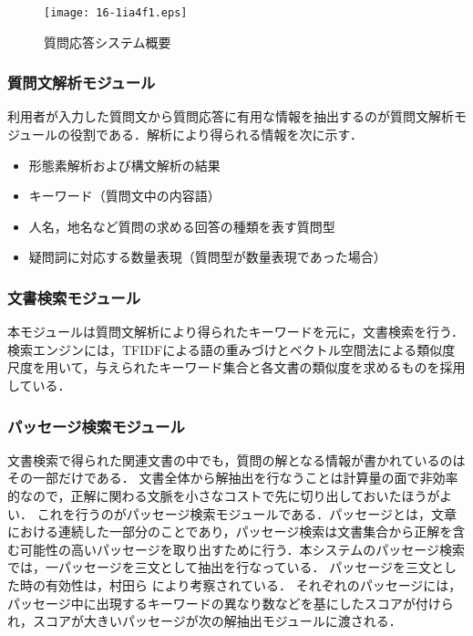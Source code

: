\documentclass[japanese]{jnlp_1.4}
\begin{document}
\begin{figure}[t]
\begin{center}
\texttt{[image: 16-1ia4f1.eps]}
\end{center}
\caption{質問応答システム概要}
\label{fig:Ranking-type-QA}
\end{figure}


\subsubsection{質問文解析モジュール}

利用者が入力した質問文から質問応答に有用な情報を抽出するのが質問文解析モジュールの役割である．解析により得られる情報を次に示す．

\begin{itemize}
\item 形態素解析および構文解析の結果
\item キーワード（質問文中の内容語）
\item 人名，地名など質問の求める回答の種類を表す質問型
\item 疑問詞に対応する数量表現（質問型が数量表現であった場合）
\end{itemize}


\subsubsection{文書検索モジュール} 

本モジュールは質問文解析により得られたキーワードを元に，文書検索を行う．検索エンジンには，TFIDFによる語の重みづけとベクトル空間法による類似度尺度を用いて，与えられたキーワード集合と各文書の類似度を求めるものを採用している．

\subsubsection{パッセージ検索モジュール}

文書検索で得られた関連文書の中でも，質問の解となる情報が書かれているのはその一部だけである．
文書全体から解抽出を行なうことは計算量の面で非効率的なので，正解に関わる文脈を小さなコストで先に切り出しておいたほうがよい．
これを行うのがパッセージ検索モジュールである．パッセージとは，文章における連続した一部分のことであり，パッセージ検索は文書集合から正解を含む可能性の高いパッセージを取り出すために行う．本システムのパッセージ検索では，一パッセージを三文として抽出を行なっている．
パッセージを三文とした時の有効性は，村田ら
\cite{Murata:DcreasedAddingJapaneseQusetionAnswering}により考察されている．
それぞれのパッセージには，パッセージ中に出現するキーワードの異なり数などを基にしたスコアが付けられ，スコアが大きいパッセージが次の解抽出モジュールに渡される．
\end{document}
